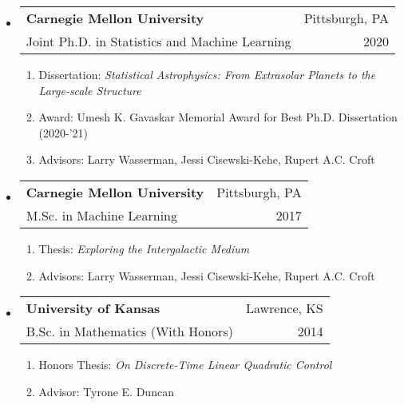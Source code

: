 \documentclass[letterpaper,10pt]{article}
\makeatletter
\newcommand{\subheadingtwolines}[4]{
\begin{tabular*}{6.45in}{l@{\cftdotfill{\cftsecdotsep}\extracolsep{\fill}}r}
#1 & #2 \\
#3 & #4 \\
\end{tabular*}}
\makeatother
\begin{document}
\begin{itemize}[leftmargin=0.4cm, itemsep=0.3cm]
\item[] \hspace{-2ex}\subheadingtwolines{{\bf Carnegie Mellon University}}{Pittsburgh, PA}{Joint Ph.D. in Statistics and Machine Learning}{2020}
\vspace{-0.1cm}
\begin{enumerate}[itemsep=0.02cm]
	\item[] \hspace{-2ex}Dissertation: {\it Statistical Astrophysics: From Extrasolar Planets to the Large-scale Structure}\\
	\vspace{-.02cm}
	\hspace{11.17ex}{\it of the Universe}
	\item[] \hspace{-2ex}Award: Umesh K. Gavaskar Memorial Award for Best Ph.D. Dissertation (2020-'21)
	\item[] \hspace{-2ex}Advisors: Larry Wasserman, Jessi Cisewski-Kehe, Rupert A.C. Croft
\end{enumerate}

\item[] \hspace{-2ex}\subheadingtwolines{{\bf Carnegie Mellon University}}{Pittsburgh, PA}{M.Sc. in Machine Learning}{2017}
\vspace{-0.1cm}
\begin{enumerate}
	\item[] \hspace{-2ex}Thesis: {\it Exploring the Intergalactic Medium}
		\vspace{-.05cm}
	\item[] \hspace{-2ex}Advisors: Larry Wasserman, Jessi Cisewski-Kehe, Rupert A.C. Croft
\end{enumerate}

\item[] \hspace{-2ex}\subheadingtwolines{{\bf University of Kansas}}{Lawrence, KS}{B.Sc. in Mathematics (With Honors)}{2014}
\vspace{-0.1cm}
\begin{enumerate}
	\item[] \hspace{-2ex}Honors Thesis: {\it On Discrete-Time Linear Quadratic Control}
		\vspace{-.05cm}
	\item[] \hspace{-2ex}Advisor: Tyrone E. Duncan
\end{enumerate}
\end{itemize}
\end{document}
